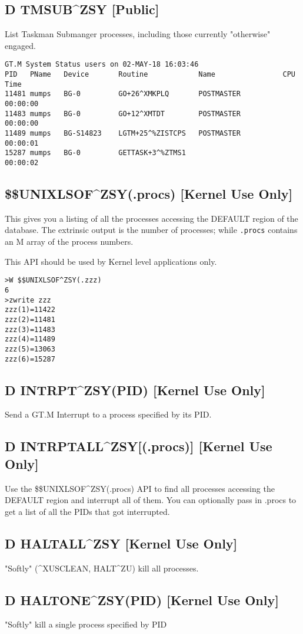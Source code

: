 \documentclass[]{article}
\begin{document}
\subsection{D TMSUB\^{}ZSY [Public]}
List Taskman Submanger processes, including those currently "otherwise" engaged.
\lstset{
	caption=TMSUB Entry Point
}
\begin{lstlisting}
GT.M System Status users on 02-MAY-18 16:03:46
PID   PName   Device       Routine            Name                CPU Time
11481 mumps   BG-0         GO+26^XMKPLQ       POSTMASTER          00:00:00
11483 mumps   BG-0         GO+12^XMTDT        POSTMASTER          00:00:00
11489 mumps   BG-S14823    LGTM+25^%ZISTCPS   POSTMASTER          00:00:01
15287 mumps   BG-0         GETTASK+3^%ZTMS1                       00:00:02
\end{lstlisting}

\subsection{\$\$UNIXLSOF\^{}ZSY(.procs) [Kernel Use Only]}
This gives you a listing of all the processes accessing the DEFAULT region of the database. The extrinsic output is the number of processes; while \texttt{.procs} contains an M array of the process numbers.

This API should be used by Kernel level applications only.
\lstset{
	caption=UNIXLSOF Entry Point
}
\begin{lstlisting}
>W $$UNIXLSOF^ZSY(.zzz)
6
>zwrite zzz
zzz(1)=11422
zzz(2)=11481
zzz(3)=11483
zzz(4)=11489
zzz(5)=13063
zzz(6)=15287
\end{lstlisting}

\subsection{D INTRPT\^{}ZSY(PID) [Kernel Use Only]}
Send a GT.M Interrupt to a process specified by its PID.

\subsection{D INTRPTALL\^{}ZSY[(.procs)] [Kernel Use Only]}
Use the \$\$UNIXLSOF\^{}ZSY(.procs) API to find all processes accessing the DEFAULT region and interrupt all of them. You can optionally pass in .procs to get a list of all the PIDs that got interrupted.

\subsection{D HALTALL\^{}ZSY [Kernel Use Only]}
"Softly" (\^{}XUSCLEAN, HALT\^{}ZU) kill all processes.

\subsection{D HALTONE\^{}ZSY(PID) [Kernel Use Only]}
"Softly" kill a single process specified by PID
\end{document}

